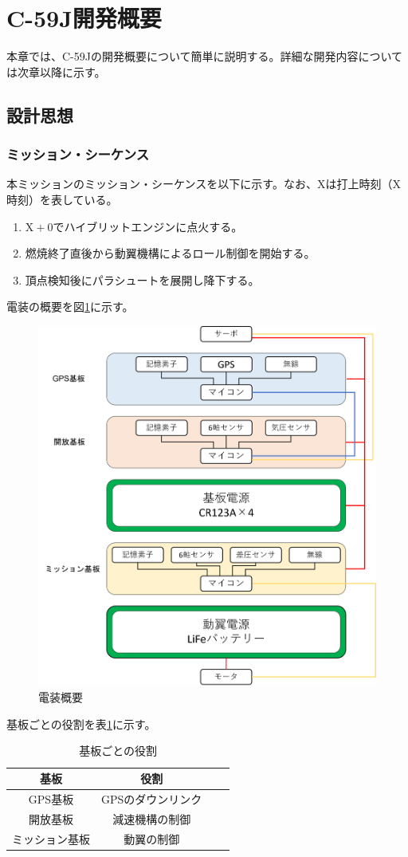 \documentclass[a4paper,11pt,titlepage,uplatex]{jsarticle}
\begin{document}
\section{C-59J開発概要}
本章では、C-59Jの開発概要について簡単に説明する。詳細な開発内容については次章以降に示す。
\subsection{設計思想}
\subsubsection{ミッション・シーケンス}
本ミッションのミッション・シーケンスを以下に示す。なお、$\mathrm{X}$は打上時刻（$\mathrm{X}$時刻）を表している。
\begin{enumerate}
    \renewcommand{\labelenumi}{\arabic{enumi}.}
    \item $\mathrm{X}+0$でハイブリットエンジンに点火する。
    \item 燃焼終了直後から動翼機構によるロール制御を開始する。
    \item 頂点検知後にパラシュートを展開し降下する。
\end{enumerate}


電装の概要を図\ref{fig:avi_all}に示す。
\begin{figure}[H]
    \centering
    \includegraphics[width=0.8\linewidth]{pic_summary/avi_all.png}
    \caption{電装概要}
    \label{fig:avi_all}
\end{figure}

基板ごとの役割を表\ref{tab:avi_ref}に示す。
\begin{table}[H]
    \centering
    \caption{基板ごとの役割}
    \begin{tabular}{cccc} \toprule
        基板      & 役割         \\ \midrule
        GPS基板   & GPSのダウンリンク \\
        開放基板    & 減速機構の制御    \\
        ミッション基板 & 動翼の制御      \\
        \bottomrule
    \end{tabular}
    \label{tab:avi_ref}
\end{table}
\end{document}
